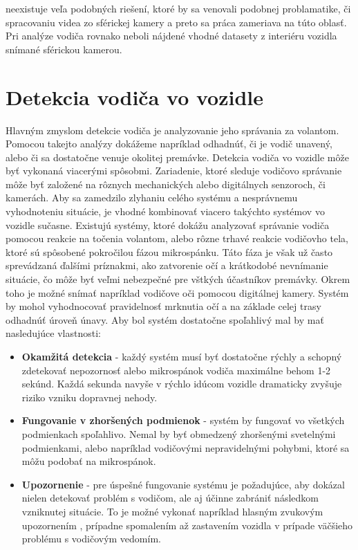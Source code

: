 \documentclass[slovak,master,dept460,male,cpp,cpdeclaration]{diploma}
\begin{document}
neexistuje veľa podobných riešení, ktoré by sa venovali podobnej problamatike, či spracovaniu videa zo sférickej kamery a preto sa práca zameriava na túto oblasť. Pri analýze vodiča rovnako neboli nájdené vhodné datasety z interiéru vozidla snímané sférickou kamerou.




\newpage
\section{Detekcia vodiča vo vozidle}
\label{sec:Pose detection}
Hlavným zmyslom detekcie vodiča je analyzovanie jeho správania za volantom.  Pomocou takejto analýzy dokážeme napríklad odhadnúť, či je vodič unavený, alebo či sa dostatočne venuje okolitej premávke. Detekcia vodiča vo vozidle môže byť vykonaná viacerými spôsobmi. Zariadenie, ktoré sleduje vodičovo správanie môže byť založené na rôznych mechanických alebo digitálnych senzoroch, či kamerách. Aby sa zamedzilo zlyhaniu celého systému a nesprávnemu vyhodnoteniu situácie, je vhodné kombinovať viacero takýchto systémov vo vozidle sučasne. Existujú systémy, ktoré dokážu analyzovať správanie vodiča pomocou reakcie na točenia volantom, alebo rôzne trhavé reakcie vodičovho tela, ktoré sú spôsobené pokročilou fázou mikrospánku. Táto fáza je však už často sprevádzaná ďalšími príznakmi, ako zatvorenie očí a  krátkodobé nevnímanie situácie, čo môže byť veľmi nebezpečné pre vštkých účastníkov premávky.  Okrem toho je možné snímať napríklad  vodičove oči pomocou digitálnej kamery. Systém by mohol vyhodnocovať  pravidelnosť mrknutia očí a na základe celej trasy odhadnúť úroveň únavy. Aby bol systém dostatočne spoľahlivý mal by mať nasledujúce vlastnosti:
\begin{itemize}
\item \textbf{Okamžitá detekcia} - každý systém musí byť dostatočne rýchly a schopný zdetekovať nepozornosť alebo mikrospánok vodiča maximálne behom 1-2 sekúnd. Každá sekunda navyše v rýchlo idúcom vozidle dramaticky zvyšuje riziko vzniku dopravnej nehody.
\item \textbf{Fungovanie v zhoršených podmienok} - systém by  fungovať vo všetkých podmienkach  spoľahlivo. Nemal by byť obmedzený zhoršenými svetelnými podmienkami, alebo napríklad vodičovými nepravidelnými pohybmi, ktoré sa môžu podobať na mikrospánok.
\item \textbf{Upozornenie} - pre úspešné fungovanie systému je požadujúce, aby dokázal nielen detekovať problém s vodičom, ale aj účinne zabrániť následkom vzniknutej situácie. To je možné vykonať napríklad hlasným zvukovým upozornením , prípadne spomalením až zastavením vozidla v prípade väčšieho problému s vodičovým vedomím. 
\end{itemize}
\end{document}
